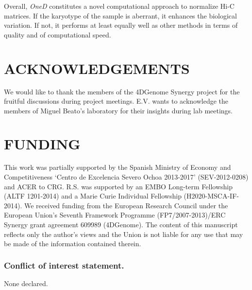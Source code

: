 \documentclass[a4,center,fleqn]{NAR}
\providecommand{\DIFaddbegin}{} %
\providecommand{\DIFaddend}{} %
\providecommand{\DIFdelbegin}{} %
\providecommand{\DIFdelend}{} %
\begin{document}
Overall, \textit{OneD} constitutes a novel computational approach to
normalize Hi-C matrices. If the karyotype of the sample is aberrant, it
enhances the biological variation.  If not, it performs at least equally
well as other methods in terms of quality and of computational speed.


\section{ACKNOWLEDGEMENTS}

We would like to thank the members of the 4DGenome Synergy project for the
fruitful discussions during project meetings. E.V. wants to acknowledge
the members of Miguel Beato's laboratory for their insights during lab
meetings.


\section{FUNDING}

This work was partially supported by the Spanish Ministry of Economy and
Competitiveness `Centro de Excelencia Severo Ochoa 2013-2017'
(SEV-2012-0208) and ACER to CRG. R.S. was supported by an EMBO Long-term
Fellowship (ALTF 1201-2014) and a Marie Curie Individual Fellowship
(H2020-MSCA-IF-2014). We received funding from the European Research
Council under the European Union's Seventh Framework Programme
(FP7/2007-2013)/ERC Synergy grant agreement 609989 (4DGenome). The content
of this manuscript reflects only the author's views and the Union is not
liable for any use that may be made of the information contained therein.

\subsubsection{Conflict of interest statement.} None declared.
\newpage

\DIFdelbegin %
\DIFdelend \DIFaddbegin 
\DIFaddend 
\end{document}
